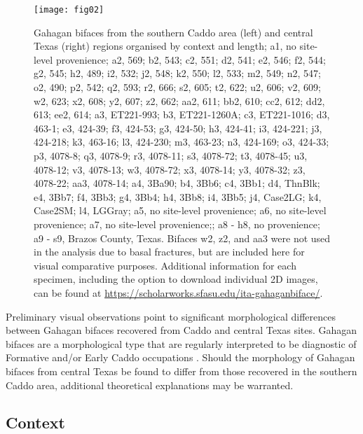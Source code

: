 \documentclass[review]{elsarticle}
\begin{document}
\begin{figure}[htbp]\centering
\texttt{[image: fig02]}
\caption{Gahagan bifaces from the southern Caddo area (left) and central Texas (right) regions organised by context and length; a1, no site-level provenience; a2, 569; b2, 543; c2, 551; d2, 541; e2, 546; f2, 544; g2, 545; h2, 489; i2, 532; j2, 548; k2, 550; l2, 533; m2, 549; n2, 547; o2, 490; p2, 542; q2, 593; r2, 666; s2, 605; t2, 622; u2, 606; v2, 609; w2, 623; x2, 608; y2, 607; z2, 662; aa2, 611; bb2, 610; cc2, 612; dd2, 613; ee2, 614; a3, ET221-993; b3, ET221-1260A; c3, ET221-1016; d3, 463-1; e3, 424-39; f3, 424-53; g3, 424-50; h3, 424-41; i3, 424-221; j3, 424-218; k3, 463-16; l3, 424-230; m3, 463-23; n3, 424-169; o3, 424-33; p3, 4078-8; q3, 4078-9; r3, 4078-11; s3, 4078-72; t3, 4078-45; u3, 4078-12; v3, 4078-13; w3, 4078-72; x3, 4078-14; y3, 4078-32; z3, 4078-22; aa3, 4078-14; a4, 3Ba90; b4, 3Bb6; c4, 3Bb1; d4, ThnBlk; e4, 3Bb7; f4, 3Bb3; g4, 3Bb4; h4, 3Bb8; i4, 3Bb5; j4, Case2LG; k4, Case2SM; l4, LGGray; a5, no site-level provenience; a6, no site-level provenience; a7, no site-level provenience;; a8 - h8, no provenience; a9 - s9, Brazos County, Texas. Bifaces w2, z2, and aa3 were not used in the analysis due to basal fractures, but are included here for visual comparative purposes. Additional information for each specimen, including the option to download individual 2D images, can be found at \href{https://scholarworks.sfasu.edu/ita-gahaganbiface/}{https://scholarworks.sfasu.edu/ita-gahaganbiface/}.}
\label{fig:fig02}
\end{figure}

Preliminary visual observations point to significant morphological differences between Gahagan bifaces recovered from Caddo and central Texas sites. Gahagan bifaces are a morphological type that are regularly interpreted to be diagnostic of Formative and/or Early Caddo occupations \citep{RN4924,RN3684}. Should the morphology of Gahagan bifaces from central Texas be found to differ from those recovered in the southern Caddo area, additional theoretical explanations may be warranted.

\subsection*{Context}
\end{document}
